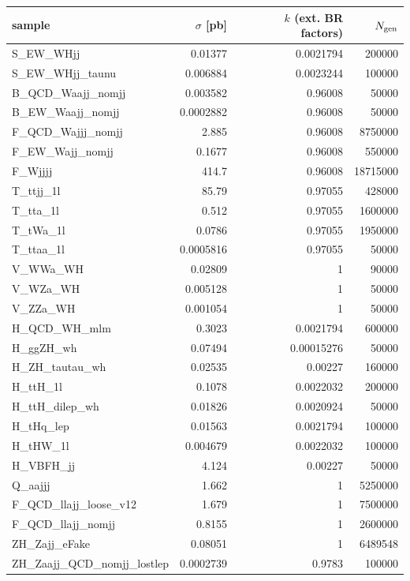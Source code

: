 \begin{table}[ht]\centering\small
\begin{tabular}{lrrr}\hline
sample & $\sigma$ [pb] & $k$ (ext. BR factors) & $N_{\rm gen}$ \\\hline
S\_EW\_WHjj & 0.01377 & 0.0021794 & 200000 \\
S\_EW\_WHjj\_taunu & 0.006884 & 0.0023244 & 100000 \\
B\_QCD\_Waajj\_nomjj & 0.003582 & 0.96008 & 50000 \\
B\_EW\_Waajj\_nomjj & 0.0002882 & 0.96008 & 50000 \\
F\_QCD\_Wajjj\_nomjj & 2.885 & 0.96008 & 8750000 \\
F\_EW\_Wajj\_nomjj & 0.1677 & 0.96008 & 550000 \\
F\_Wjjjj & 414.7 & 0.96008 & 18715000 \\
T\_ttjj\_1l & 85.79 & 0.97055 & 428000 \\
T\_tta\_1l & 0.512 & 0.97055 & 1600000 \\
T\_tWa\_1l & 0.0786 & 0.97055 & 1950000 \\
T\_ttaa\_1l & 0.0005816 & 0.97055 & 50000 \\
V\_WWa\_WH & 0.02809 & 1 & 90000 \\
V\_WZa\_WH & 0.005128 & 1 & 50000 \\
V\_ZZa\_WH & 0.001054 & 1 & 50000 \\
H\_QCD\_WH\_mlm & 0.3023 & 0.0021794 & 600000 \\
H\_ggZH\_wh & 0.07494 & 0.00015276 & 50000 \\
H\_ZH\_tautau\_wh & 0.02535 & 0.00227 & 160000 \\
H\_ttH\_1l & 0.1078 & 0.0022032 & 200000 \\
H\_ttH\_dilep\_wh & 0.01826 & 0.0020924 & 50000 \\
H\_tHq\_lep & 0.01563 & 0.0021794 & 100000 \\
H\_tHW\_1l & 0.004679 & 0.0022032 & 100000 \\
H\_VBFH\_jj & 4.124 & 0.00227 & 50000 \\
Q\_aajjj & 1.662 & 1 & 5250000 \\
F\_QCD\_llajj\_loose\_v12 & 1.679 & 1 & 7500000 \\
F\_QCD\_llajj\_nomjj & 0.8155 & 1 & 2600000 \\
ZH\_Zajj\_eFake & 0.08051 & 1 & 6489548 \\
ZH\_Zaajj\_QCD\_nomjj\_lostlep & 0.0002739 & 0.9783 & 100000 \\

\end{tabular}
\end{table}
